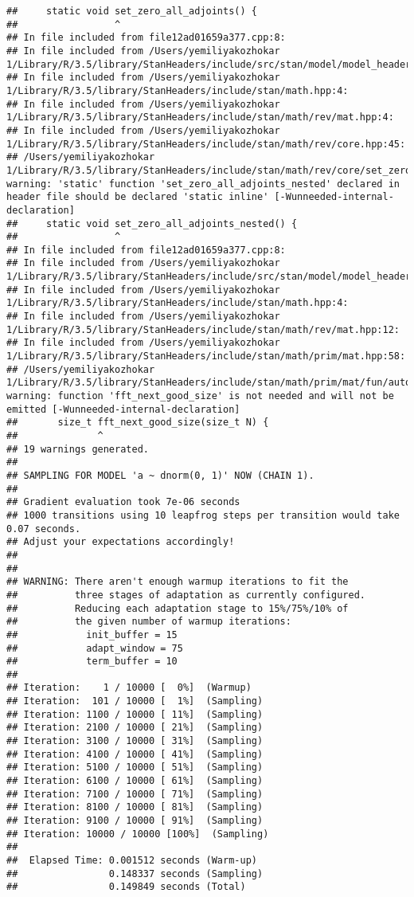\documentclass[]{article}
\begin{document}
\begin{verbatim}
##     static void set_zero_all_adjoints() {
##                 ^
## In file included from file12ad01659a377.cpp:8:
## In file included from /Users/yemiliyakozhokar 1/Library/R/3.5/library/StanHeaders/include/src/stan/model/model_header.hpp:4:
## In file included from /Users/yemiliyakozhokar 1/Library/R/3.5/library/StanHeaders/include/stan/math.hpp:4:
## In file included from /Users/yemiliyakozhokar 1/Library/R/3.5/library/StanHeaders/include/stan/math/rev/mat.hpp:4:
## In file included from /Users/yemiliyakozhokar 1/Library/R/3.5/library/StanHeaders/include/stan/math/rev/core.hpp:45:
## /Users/yemiliyakozhokar 1/Library/R/3.5/library/StanHeaders/include/stan/math/rev/core/set_zero_all_adjoints_nested.hpp:17:17: warning: 'static' function 'set_zero_all_adjoints_nested' declared in header file should be declared 'static inline' [-Wunneeded-internal-declaration]
##     static void set_zero_all_adjoints_nested() {
##                 ^
## In file included from file12ad01659a377.cpp:8:
## In file included from /Users/yemiliyakozhokar 1/Library/R/3.5/library/StanHeaders/include/src/stan/model/model_header.hpp:4:
## In file included from /Users/yemiliyakozhokar 1/Library/R/3.5/library/StanHeaders/include/stan/math.hpp:4:
## In file included from /Users/yemiliyakozhokar 1/Library/R/3.5/library/StanHeaders/include/stan/math/rev/mat.hpp:12:
## In file included from /Users/yemiliyakozhokar 1/Library/R/3.5/library/StanHeaders/include/stan/math/prim/mat.hpp:58:
## /Users/yemiliyakozhokar 1/Library/R/3.5/library/StanHeaders/include/stan/math/prim/mat/fun/autocorrelation.hpp:17:14: warning: function 'fft_next_good_size' is not needed and will not be emitted [-Wunneeded-internal-declaration]
##       size_t fft_next_good_size(size_t N) {
##              ^
## 19 warnings generated.
## 
## SAMPLING FOR MODEL 'a ~ dnorm(0, 1)' NOW (CHAIN 1).
## 
## Gradient evaluation took 7e-06 seconds
## 1000 transitions using 10 leapfrog steps per transition would take 0.07 seconds.
## Adjust your expectations accordingly!
## 
## 
## WARNING: There aren't enough warmup iterations to fit the
##          three stages of adaptation as currently configured.
##          Reducing each adaptation stage to 15%/75%/10% of
##          the given number of warmup iterations:
##            init_buffer = 15
##            adapt_window = 75
##            term_buffer = 10
## 
## Iteration:    1 / 10000 [  0%]  (Warmup)
## Iteration:  101 / 10000 [  1%]  (Sampling)
## Iteration: 1100 / 10000 [ 11%]  (Sampling)
## Iteration: 2100 / 10000 [ 21%]  (Sampling)
## Iteration: 3100 / 10000 [ 31%]  (Sampling)
## Iteration: 4100 / 10000 [ 41%]  (Sampling)
## Iteration: 5100 / 10000 [ 51%]  (Sampling)
## Iteration: 6100 / 10000 [ 61%]  (Sampling)
## Iteration: 7100 / 10000 [ 71%]  (Sampling)
## Iteration: 8100 / 10000 [ 81%]  (Sampling)
## Iteration: 9100 / 10000 [ 91%]  (Sampling)
## Iteration: 10000 / 10000 [100%]  (Sampling)
## 
##  Elapsed Time: 0.001512 seconds (Warm-up)
##                0.148337 seconds (Sampling)
##                0.149849 seconds (Total)
\end{verbatim}
\end{document}
